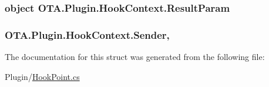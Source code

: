 \subsubsection[{Result\+Param}]{\setlength{\rightskip}{0pt plus 5cm}object O\+T\+A.\+Plugin.\+Hook\+Context.\+Result\+Param\hspace{0.3cm}{\ttfamily [get]}}\label{struct_o_t_a_1_1_plugin_1_1_hook_context_a970558ee2c50a571d99e3cbd0929d4f4}
\hypertarget{struct_o_t_a_1_1_plugin_1_1_hook_context_af74bc71edf8001171e93211a12994453}{}
\subsubsection[{Sender}]{ O\+T\+A.\+Plugin.\+Hook\+Context.\+Sender\hspace{0.3cm}{\ttfamily [get]}, {\ttfamily [set]}}\label{struct_o_t_a_1_1_plugin_1_1_hook_context_af74bc71edf8001171e93211a12994453}


The documentation for this struct was generated from the following file\+:\begin{DoxyCompactItemize}
\item 
Plugin/\hyperlink{_hook_point_8cs}{Hook\+Point.\+cs}\end{DoxyCompactItemize}
